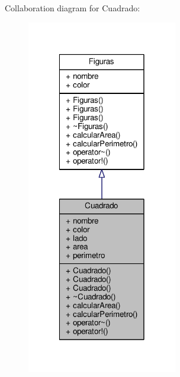 Collaboration diagram for Cuadrado\+:
\nopagebreak
\begin{figure}[H]
\begin{center}
\leavevmode
\includegraphics[width=186pt]{class_cuadrado__coll__graph}
\end{center}
\end{figure}
